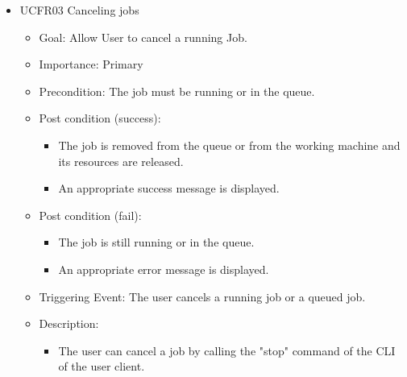 \begin{itemize}
  \item UCFR03 Canceling jobs
    \begin{itemize}
      \item Goal: Allow User to cancel a running Job.
      \item Importance: Primary
      \item Precondition: The job must be running or in the queue.
      \item Post condition (success):
        \begin{itemize}
          \item The job is removed from the queue or from the working machine and its resources are released.
          \item An appropriate success message is displayed.
        \end{itemize}
      \item Post condition (fail):
        \begin{itemize}
          \item The job is still running or in the queue.
          \item An appropriate error message is displayed.
        \end{itemize}
      \item Triggering Event: The user cancels a running job or a queued job.
      \item Description:
        \begin{itemize}
          \item   The user can cancel a job by calling the "stop" command of the CLI of the user client.
        \end{itemize}
    \end{itemize}


\end{itemize}
